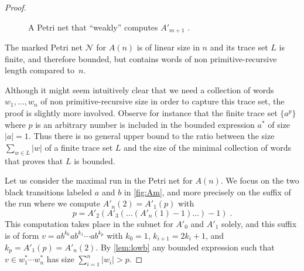 \documentclass[11pt,reqno,a4paper]{amsart}
\theoremstyle{plain}
\theoremstyle{definition}
\theoremstyle{remark}
\begin{document}
\begin{proof}
\begin{figure*}[tb]
\caption{\label{fig:Am}A Petri net that ``weakly'' computes $A'_{m+1}$ \citep{j87}.}
\end{figure*}The marked Petri net $\mathcal{N}$ for $A(n)$ is of linear size in $n$
and its trace set $L$ is finite, and therefore bounded, but contains words
of non primitive-recursive length compared to~$n$.

Although it might seem intuitively clear that we need a collection of
words $w_1,\dots,w_n$ of non primitive-recursive size in order to
capture this trace set, the proof is slightly more involved.  Observe for
instance that the finite trace set $\{a^p\}$ where $p$ is an arbitrary
number is included in the bounded expression $a^\ast$ of size
$|a|=1$.  Thus there is no general upper bound to the ratio between the size
$\sum_{w\in L}|w|$ of a finite trace set $L$ and the size of the minimal
collection of words that proves that $L$ is bounded.

Let us consider the maximal run in the Petri net for $A(n)$.  We focus
on the two black transitions labeled $a$ and $b$ in \autoref{fig:Am}, and more
precisely on the suffix of the run where we compute
$A'_n(2)=A'_1(p)$ with
\begin{equation*}
  p=A'_2(A'_3(\dots (A'_n(1) - 1)\dots)-1)\;.
\end{equation*}
This computation takes place in the subnet for $A'_0$ and $A'_1$ solely,
and this suffix is of form $v=ab^{k_0}ab^{k_1}\cdots ab^{k_p}$
with $k_0=1$, $k_{i+1}=2k_i+1$, and $k_p=A'_1(p)=A'_n(2)$.  By
\autoref{lem:lowb} any bounded expression such that $v\in w_1^\ast\cdots
  w_n^\ast$ has size $\sum_{i=1}^n|w_i|>p$.


\end{proof}
\end{document}
